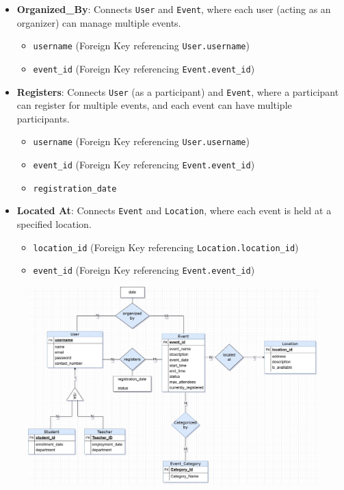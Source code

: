 \begin{itemize}
    \item \textbf{Organized\_By}: Connects \texttt{User} and \texttt{Event}, where each user (acting as an organizer) can manage multiple events.
    \begin{itemize}
        \item \texttt{username} (Foreign Key referencing \texttt{User.username})
        \item \texttt{event\_id} (Foreign Key referencing \texttt{Event.event\_id})
    \end{itemize}

    \item \textbf{Registers}: Connects \texttt{User} (as a participant) and \texttt{Event}, where a participant can register for multiple events, and each event can have multiple participants.
    \begin{itemize}
        \item \texttt{username} (Foreign Key referencing \texttt{User.username})
        \item \texttt{event\_id} (Foreign Key referencing \texttt{Event.event\_id})
        \item \texttt{registration\_date}
    \end{itemize}

    \item \textbf{Located At}: Connects \texttt{Event} and \texttt{Location}, where each event is held at a specified location.
    \begin{itemize}
        \item \texttt{location\_id} (Foreign Key referencing \texttt{Location.location\_id})
        \item \texttt{event\_id} (Foreign Key referencing \texttt{Event.event\_id})
    \end{itemize}
\end{itemize}
\newpage
\begin{figure}[h]
    \centering
    \hspace*{-2.5cm} %
    \includegraphics[scale=.4]{images/er_diagram.jpg}
\end{figure}



